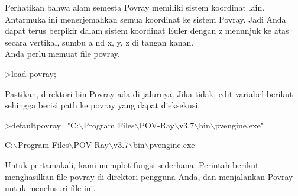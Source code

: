 \documentclass{article}
\begin{document}
\begin{eulernotebook}
\begin{eulercomment}
\begin{eulercomment}
\begin{eulercomment}
\begin{eulercomment}
\begin{eulercomment}
\begin{eulercomment}
\begin{eulercomment}
\begin{eulercomment}
\begin{eulercomment}
\begin{eulercomment}
\begin{eulercomment}
\begin{eulercomment}
\begin{eulercomment}
\begin{eulercomment}
\begin{eulercomment}
\begin{eulercomment}
\begin{eulercomment}
\begin{eulercomment}
\begin{eulercomment}
\begin{eulercomment}
\begin{eulercomment}
Perhatikan bahwa alam semesta Povray memiliki sistem koordinat lain.
Antarmuka ini menerjemahkan semua koordinat ke sistem Povray. Jadi
Anda dapat terus berpikir dalam sistem koordinat Euler dengan z
menunjuk ke atas secara vertikal, sumbu a nd x, y, z di tangan kanan.\\
Anda perlu memuat file povray.
\end{eulercomment}
\begin{eulerprompt}
>load povray;
\end{eulerprompt}
\begin{eulercomment}
Pastikan, direktori bin Povray ada di jalurnya. Jika tidak, edit
variabel berikut sehingga berisi path ke povray yang dapat dieksekusi.
\end{eulercomment}
\begin{eulerprompt}
>defaultpovray="C:\(\backslash\)Program Files\(\backslash\)POV-Ray\(\backslash\)v3.7\(\backslash\)bin\(\backslash\)pvengine.exe"
\end{eulerprompt}
\begin{euleroutput}
  C:\(\backslash\)Program Files\(\backslash\)POV-Ray\(\backslash\)v3.7\(\backslash\)bin\(\backslash\)pvengine.exe
\end{euleroutput}
\begin{eulercomment}
Untuk pertamakali, kami memplot fungsi sederhana. Perintah berikut
menghasilkan file povray di direktori pengguna Anda, dan menjalankan
Povray untuk menelusuri file ini.


\end{eulercomment}
\end{eulercomment}
\end{eulercomment}
\end{eulercomment}
\end{eulercomment}
\end{eulercomment}
\end{eulercomment}
\end{eulercomment}
\end{eulercomment}
\end{eulercomment}
\end{eulercomment}
\end{eulercomment}
\end{eulercomment}
\end{eulercomment}
\end{eulercomment}
\end{eulercomment}
\end{eulercomment}
\end{eulercomment}
\end{eulercomment}
\end{eulercomment}
\end{eulercomment}
\end{eulernotebook}
\end{document}
